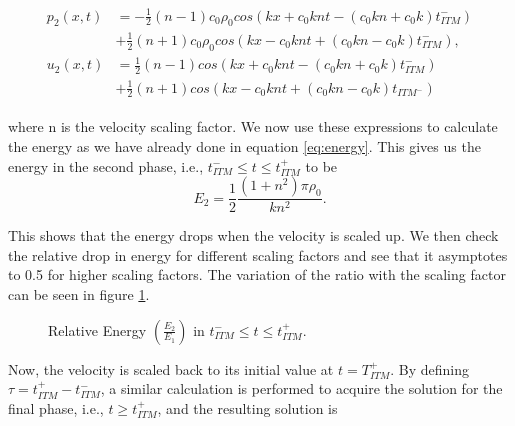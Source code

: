 \begin{align}
    \begin{split}
        p_{2}\left(x, t\right) &= -\frac{1}{2} \left(n-1\right)c_0\rho_0cos\left(kx + c_0knt - \left(c_0kn + c_0k\right)t_{ITM}^-\right) \\
        &+ \frac{1}{2} \left(n+1\right)c_0\rho_0cos\left(kx - c_0knt + \left(c_0kn - c_0k\right)t_{ITM}^-\right), \\
        u_{2}\left(x, t\right) &= \frac{1}{2}\left(n-1\right)cos\left(kx + c_0knt - \left(c_0kn + c_0k\right)t_{ITM}^-\right)\\
        &+ \frac{1}{2}\left(n+1\right)cos\left(kx - c_0knt + \left(c_0kn-c_0k\right)t_{ITM^-}\right)
    \end{split}
\end{align}

where n is the velocity scaling factor. We now use these expressions to calculate the energy as we have already done in equation \ref{eq:energy}. This gives us the energy in the second phase, i.e., $t_{ITM}^- \leq t \leq t_{ITM}^+ $ to be
\begin{equation}
    E_2 = \frac{1}{2}\frac{\left(1 + n^2\right)\pi \rho_0}{kn^2} .
\end{equation}

This shows that the energy drops when the velocity is scaled up. We then check the relative drop in energy for different scaling factors and see that it asymptotes to 0.5 for higher scaling factors. The variation of the ratio with the scaling factor can be seen in figure \ref{fig:ratio1}.

\begin{figure}
    \centering
    \caption{Relative Energy $\left(\frac{E_2}{E_1}\right)$ in $t_{ITM}^- \leq t \leq t_{ITM}^+$. }
    \label{fig:ratio1}
\end{figure}

Now, the velocity is scaled back to its initial value at $t=T_{ITM}^+$. By defining $\tau = t_{ITM}^+ - t_{ITM}^-$, a similar calculation is performed to acquire the
solution for the final phase, i.e., $t \geq t_{ITM}^+$, and the resulting solution is


